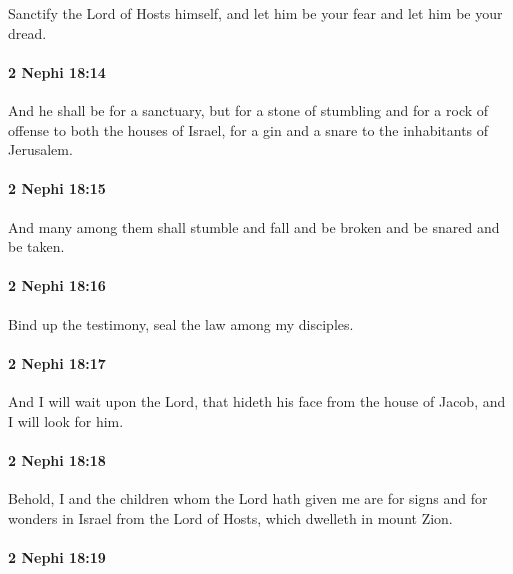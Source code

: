 			Sanctify the Lord of Hosts himself,
			and let him be your fear and let him be your dread.

		\paragraph{2 Nephi 18:14} %
			\label{2NEPHI-18-14}

			And he shall be for a sanctuary,
			but for a stone of stumbling and for a rock of offense to both the houses of Israel,
			for a gin and a snare to the inhabitants of Jerusalem.

		\paragraph{2 Nephi 18:15} %
			\label{2NEPHI-18-15}

			And many among them shall stumble and fall
			and be broken and be snared and be taken.

		\paragraph{2 Nephi 18:16} %
			\label{2NEPHI-18-16}

			Bind up the testimony,
			seal the law among my disciples.

		\paragraph{2 Nephi 18:17} %
			\label{2NEPHI-18-17}

			And I will wait upon the Lord,
			that hideth his face from the house of Jacob,
			and I will look for him.

		\paragraph{2 Nephi 18:18} %
			\label{2NEPHI-18-18}

			Behold, I and the children whom the Lord hath given me
			are for signs and for wonders in Israel
			from the Lord of Hosts, which dwelleth in mount Zion.

		\paragraph{2 Nephi 18:19} %
			\label{2NEPHI-18-19}


